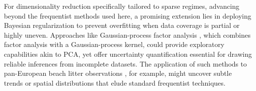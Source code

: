 For dimensionality reduction specifically tailored to sparse regimes, advancing beyond the frequentist methods used here, a promising extension lies in deploying Bayesian regularization to prevent overfitting when data coverage is partial or highly uneven. Approaches like Gaussian-process factor analysis \cite{yu_gaussian-process_2008,luttinen_variational_2009}, which combines factor analysis with a Gaussian-process kernel, could provide exploratory capabilities akin to PCA, yet offer uncertainty quantification essential for drawing reliable inferences from incomplete datasets. The application of such methods to pan-European beach litter observations \cite{molina_jack_emodnet_2019}, for example, might uncover subtle trends or spatial distributions that elude standard frequentist techniques.
